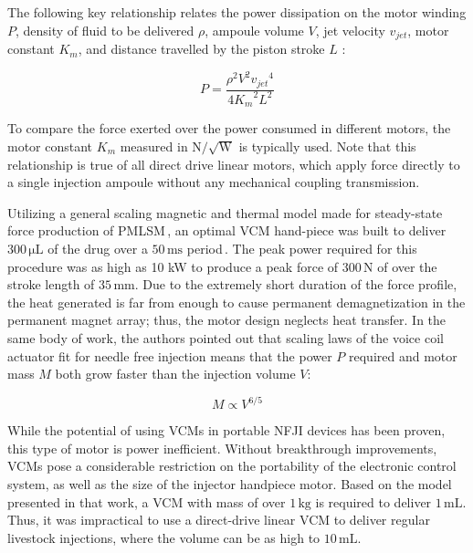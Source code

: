     
    The following key relationship relates the power dissipation on the motor winding $P$, density of fluid to be delivered $\rho$, ampoule volume $V$, jet velocity $v_{jet}$, motor constant $K_m$, and distance travelled by the piston stroke $L$ \cite{Williams2012}:
    
    
    \begin{equation}
        P=\frac{\rho^2 V^2 {v_{jet}}^4}{4 {K_m}^2 L^2}
        \label{eq:power required for F,V,v_jet,K_m, and L}
    \end{equation}
    
    
    To compare the force exerted over the power consumed in different motors, the motor constant $K_m$ measured in $\mathrm{N/\sqrt{W}}$  is typically used. Note that this relationship is true of all direct drive linear motors, which apply force directly to a single injection ampoule without any mechanical coupling transmission.
    
    
    Utilizing a general scaling magnetic and thermal model made for steady-state force production of \ac{PMLSM}\,\cite{Ruddy2011}, an optimal \acs{VCM} hand-piece was built to deliver $\mathrm{300\,\mu L}$ of the drug over a $\mathrm{50\,ms}$ period\,\cite{taberner2006}. The peak power required for this procedure was as high as 10 kW to produce a peak force of $\mathrm{300\,N}$ of over the stroke length of $\mathrm{35\,mm}$. Due to the extremely short duration of the force profile, the heat generated is far from enough to cause permanent demagnetization in the permanent magnet array; thus, the motor design neglects heat transfer. In the same body of work, the authors pointed out that scaling laws of the voice coil actuator fit for needle free injection means that the power $P$ required and motor mass $M$ both grow faster than the injection volume $V$:
    
    
    \begin{equation}
        M \propto V^{6/5}
        \label{eq:scaling property of VCM}
    \end{equation}


    While the potential of using \acsp{VCM} in portable \acs{NFJI} devices has been proven, this type of motor is power inefficient. Without breakthrough improvements, \acsp{VCM} pose a considerable restriction on the portability of the electronic control system, as well as the size of the injector handpiece motor. Based on the model presented in that work, a \acs{VCM} with mass of over $\mathrm{1\,kg}$ is required to deliver $\mathrm{1\,mL}$. Thus, it was impractical to use a direct-drive linear \acs{VCM} to deliver regular livestock injections, where the volume can be as high to $\mathrm{10\,mL}$. 

